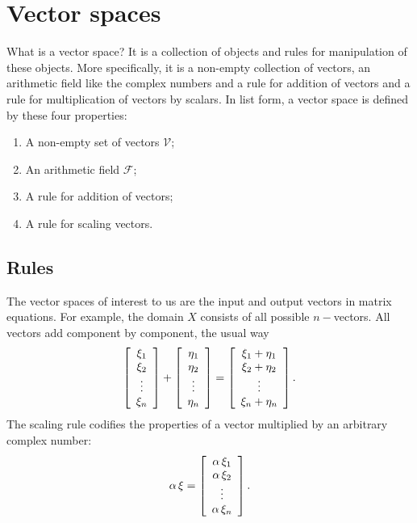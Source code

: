 \section{Vector spaces}
What is a vector space? It is a collection of objects and rules for manipulation of these objects. More specifically, it is a non-empty collection of vectors, an arithmetic field like the complex numbers and a rule for addition of vectors and a rule for multiplication of vectors by scalars. In list form, a vector space is defined by these four properties:
\begin{enumerate}
\item A non-empty set of vectors $\mathcal{V}$;
\item An arithmetic field $\mathcal{F}$;
\item A rule for addition of vectors;
\item A rule for scaling vectors.
\end{enumerate}

\subsection{Rules}
The vector spaces of interest to us are the input and output vectors in matrix equations. For example, the domain $X$ consists of all possible $n-$vectors. All vectors add component by component, the usual way
\begin{equation}
  \mat{c}
  {
  \xi_{1}\\
  \xi_{2}\\
  \vdots \\
  \xi_{n}
  }
  +
  \mat{c}
  {
  \eta_{1}\\
  \eta_{2}\\
  \vdots \\
  \eta_{n}
  }
  =
  \mat{c}
  {
  \xi_{1}+\eta_{1}\\
  \xi_{2}+\eta_{2}\\
  \vdots \\
  \xi_{n}+\eta_{n}
  }.
\end{equation}
The scaling rule codifies the properties of a vector multiplied by an arbitrary complex number:
\begin{equation}
  \alpha \, \xi = 
  \mat{c}
  {
  \alpha \, \xi_{1}\\
  \alpha \, \xi_{2}\\
  \vdots  \\
  \alpha \, \xi_{n}
  }.
\end{equation}


